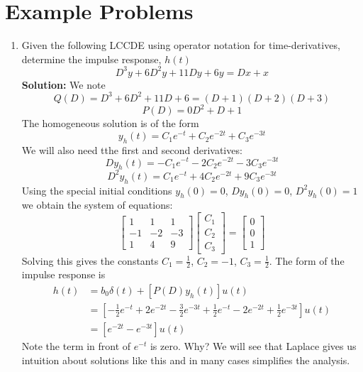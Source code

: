 \documentclass{article}
\begin{document}
\section{Example Problems}

\begin{enumerate}
	\item Given the following LCCDE using operator notation for time-derivatives, determine the impulse response, $h(t)$
	      \begin{equation}
		      D^3y + 6D^2y + 11Dy + 6y = Dx + x
	      \end{equation}
	      \textbf{Solution:} We note
	      \[
		      Q(D) = D^3 + 6D^2 + 11D + 6 = (D+1)(D+2)(D+3)
	      \]
	      \[
		      P(D) = 0D^2 + D + 1
	      \]
	      The homogeneous solution is of the form
	      \[
		      y_h(t) = C_1e^{-t} + C_2e^{-2t} + C_3e^{-3t}
	      \]
	      We will also need tthe first and second derivatives:
	      \[
		      D y_h(t) = -C_1e^{-t} -2 C_2e^{-2t} -3 C_3e^{-3t}
	      \]
	      \[
		      D^2 y_h(t) = C_1e^{-t} +4C_2e^{-2t} +9 C_3e^{-3t}
	      \]
	      Using the special initial conditions $y_h(0) = 0$, $D y_h(0) = 0$, $D^2 y_h(0) = 1$ we obtain the system of equations:
	      \[
		      \begin{bmatrix}
			      1  & 1  & 1  \\
			      -1 & -2 & -3 \\
			      1  & 4  & 9
		      \end{bmatrix}
		      \begin{bmatrix}
			      C_1 \\ C_2 \\ C_3
		      \end{bmatrix}
		      =
		      \begin{bmatrix}
			      0 \\ 0 \\ 1
		      \end{bmatrix}
	      \]
	      Solving this gives the constants $C_1 = \frac{1}{2}$, $C_2 = -1$, $C_3 = \frac{1}{2}$. The form of the impulse response is
	      \begin{align}
		      h(t) & = b_0\delta(t) + \left[ P(D) y_h(t) \right] u(t)                                                                             \\
		           & = \left[-\frac{1}{2} e^{-t} + 2e^{-2t} - \frac{3}{2}e^{-3t} + \frac{1}{2}e^{-t} - 2e^{-2t} + \frac{1}{2}e^{-3t} \right] u(t) \\
		           & = \left[e^{-2t} - e^{-3t}\right] u(t)
	      \end{align}
	      Note the term in front of $e^{-t}$ is zero. Why? We will see that Laplace gives us intuition about solutions like this and in many cases simplifies the analysis.


\end{enumerate}
\end{document}
